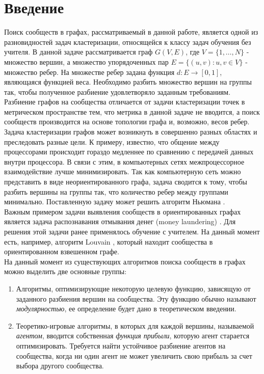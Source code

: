 \chapter{Введение}

Поиск сообществ в графах, рассматриваемый в данной работе, является одной из разновидностей задач кластеризации, относящейся к классу задач обучения без учителя. В данной задаче рассматривается граф $G(V, E)$, где $V=\{1,\dots,N\}$ - множество вершин, а множество упорядоченных пар $E=\{(u,v): u,v\in V\}$ - множество ребер. На множестве ребер задана функция $d:E\rightarrow [0,1]$, являющаяся функцией веса. Необходимо разбить множество вершин на группы так, чтобы полученное разбиение удовлетворяло заданным требованиям. Разбиение графов на сообщества отличается от задачи кластеризации точек в метрическом пространстве тем, что метрика в данной задаче не вводится, а поиск сообществ производится на основе топологии графа и, возможно, весов ребер. \\

Задача кластеризации графов может возникнуть в совершенно разных областях и преследовать разные цели. К примеру, известно, что общение между процессорами происходит гораздо медленнее по сравнению с передачей данных внутри процессора. В связи с этим, в компьютерных сетях межпроцессорное взаимодействие лучше минимизировать. Так как компьютерную сеть можно представить в виде неориентированного графа, задача сводится к тому, чтобы разбить вершины на группы так, что количество ребер между группами минимально. Поставленную задачу может решить алгоритм Ньюмана \cite{Newman2004}.\\

Важным примером задачи выявления сообществ в ориентированных графах является задача распознавания отмывания денег (money laundering) \cite{ml}. Для решения этой задачи ранее применялось обучение с учителем. На данный момент есть, например, алгоритм Louvain \cite{ml1}, который находит сообщества в ориентированном взвешенном графе.\\

На данный момент из существующих алгоритмов поиска сообществ в графах можно выделить две основные группы: 
\begin{enumerate}
	\item Алгоритмы, оптимизирующие некоторую целевую функцию, зависящую от заданного разбиения вершин на сообщества. Эту функцию обычно называют \textit{модулярностью}, ее определение будет дано в теоретическом введении.
	
	\item Теоретико-игровые алгоритмы, в которых для каждой вершины, называемой \textit{агентом}, вводится собственная \textit{функция прибыли}, которую агент старается оптимизировать. Требуется найти устойчивое разбиение агентов на сообщества, когда ни один агент не может увеличить свою прибыль за счет выбора другого сообщества.
\end{enumerate} 

